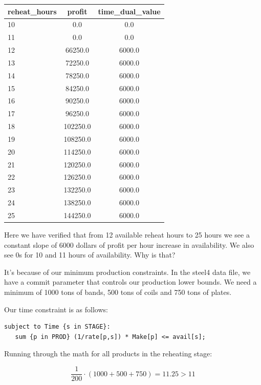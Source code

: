 \begin{table}[!ht]
    \centering
    \begin{tabular}{lcc}
    \hline
        reheat\_hours & profit & time\_dual\_value \\ \hline
        10 & 0.0 & 0.0 \\
        11 & 0.0 & 0.0 \\
        12 & 66250.0 & 6000.0 \\
        13 & 72250.0 & 6000.0 \\
        14 & 78250.0 & 6000.0 \\
        15 & 84250.0 & 6000.0 \\
        16 & 90250.0 & 6000.0 \\
        17 & 96250.0 & 6000.0 \\
        18 & 102250.0 & 6000.0 \\
        19 & 108250.0 & 6000.0 \\
        20 & 114250.0 & 6000.0 \\
        21 & 120250.0 & 6000.0 \\
        22 & 126250.0 & 6000.0 \\
        23 & 132250.0 & 6000.0 \\
        24 & 138250.0 & 6000.0 \\
        25 & 144250.0 & 6000.0 \\
    \hline
    \end{tabular}
\end{table}


Here we have verified that from 12 available reheat hours to 25 hours we see a constant slope of 6000 dollars of profit per hour increase in availability. We also see 0s for 10 and 11 hours of availability. Why is that?

It's because of our minimum production constraints. In the steel4 data file, we have a commit parameter that controls our production lower bounds. We need a minimum of 1000 tons of bands, 500 tons of coils and 750 tons of plates.

Our time constraint is as follows:

\begin{lstlisting}
subject to Time {s in STAGE}:
   sum {p in PROD} (1/rate[p,s]) * Make[p] <= avail[s];
\end{lstlisting}

Running through the math for all products in the reheating stage:

\[
	\frac{1}{200} \cdot (1000 + 500 + 750) = 11.25 > 11
\]

